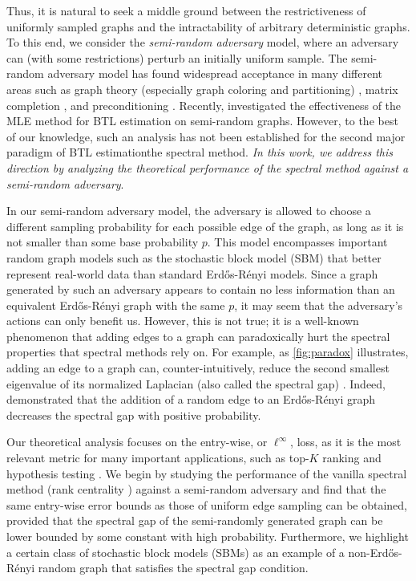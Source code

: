 \documentclass[sigconf,nonacm,pbalance]{acmart}
\begin{document}
Thus, it is natural to seek a middle ground between the restrictiveness of uniformly sampled graphs and the intractability of arbitrary deterministic graphs. To this end, we consider the \emph{semi-random adversary} model, where an adversary can (with some restrictions) perturb an initially uniform sample. The semi-random adversary model has found widespread acceptance in many different areas such as graph theory (especially graph coloring and partitioning) \cite{BlumSpencer1995,FeigeKilian2001,MakarychevMakarychevVijayaraghavan2012,AsilisChenHansesn2026}, matrix completion \cite{ChengGe2018,KelnerLiLiu2023,GaoCheng2023}, and preconditioning \cite{JambulapatiLiMusco2021}. Recently, \cite{MonotoneAdversary} investigated the effectiveness of the MLE method for BTL estimation on semi-random graphs. However, to the best of our knowledge, such an analysis has not been established for the second major paradigm of BTL estimation\textemdash the spectral method. \emph{In this work, we address this direction by analyzing the theoretical performance of the spectral method against a semi-random adversary}.

In our semi-random adversary model, the adversary is allowed to choose a different sampling probability for each possible edge of the graph, as long as it is not smaller than some base probability $p$. This model encompasses important random graph models such as the stochastic block model (SBM) \cite{HollandBlackmondLeinhardt1983} that better represent real-world data than standard Erd\H{o}s-R\'{e}nyi models. Since a graph generated by such an adversary appears to contain no less information than an equivalent Erd\H{o}s-R\'{e}nyi graph with the same $p$, it may seem that the adversary's actions can only benefit us. However, this is not true; it is a well-known phenomenon that adding edges to a graph can paradoxically hurt the spectral properties that spectral methods rely on. For example, as \cref{fig:paradox} illustrates, adding an edge to a graph can, counter-intuitively, reduce the second smallest eigenvalue of its normalized Laplacian (also called the spectral gap) \cite{Fiedler1973}.
Indeed, \cite{EldanRaczSchramm2017} demonstrated that the addition of a random edge to an Erd\H{o}s-R\'{e}nyi graph decreases the spectral gap with positive probability.

Our theoretical analysis focuses on the entry-wise, or $\ell^\infty$, loss, as it is the most relevant metric for many important applications, such as top-$K$ ranking \cite{ChenSuh2015,Chenetal2019,MonotoneAdversary} and hypothesis testing \cite{LagrangianInference,MakurSingh2025,MakurSingh2025a}. We begin by studying the performance of the vanilla spectral method (rank centrality \cite{NegahbanOhShah2017}) against a semi-random adversary and find that the same entry-wise error bounds as those of uniform edge sampling can be obtained, provided that the spectral gap of the semi-randomly generated graph can be lower bounded by some constant with high probability. Furthermore, we highlight a certain class of stochastic block models (SBMs) as an example of a non-Erd\H{o}s-R\'{e}nyi random graph that satisfies the spectral gap condition.
\end{document}
